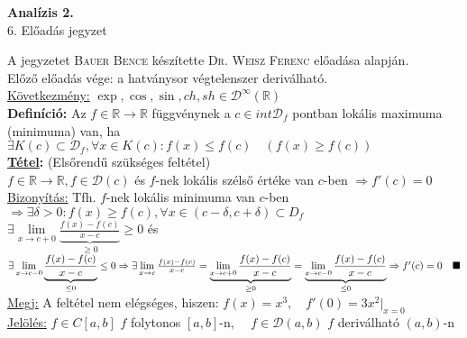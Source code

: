 \documentclass[a4paper,11pt]{article}
\begin{document}
\def\N{\mathbb{N}}
\def\Z{\mathbb{Z}}
\def\R{\mathbb{R}}
\def\biz{\normalsize{\underline{Bizonyítás:} }\hspace*{0.5cm}}
\def\tetel{\normalsize \textbf{\underline{Tétel}: }}
\def\defi{\normalsize \textbf{Definíció: }}
\def\pl{\textbf{Pl:}}
\def\cab{\in C[a,b]}
\def\dab{\in\D(a,b)}
\def\rtr{\R\to\R}
\def\D{\mathcal{D}}
\def\lima{\displaystyle\lim_{a}}
\def\bizva{\quad\blacksquare}
\def\fda{f\in\D(a)}
\begin{center}
	{\LARGE\textbf{Analízis 2.}}\\[0.2cm]
	
	{\Large 6. Előadás jegyzet}\\[0.5cm]	
\end{center}
{\small A jegyzetet \textsc{Bauer Bence} készítette \textsc{Dr. Weisz Ferenc} előadása alapján.}\\[0.4cm]
Előző előadás vége: a hatványsor végtelenszer deriválható.\\[0.1cm]
\underline{Következmény:} $\exp,\cos,\sin,ch,sh\in\D^{\infty}(\R)$\\[0.1cm]
\defi Az $f\in\rtr$ függvénynek a $c\in int\D_f$ pontban lokális maximuma 
(minimuma) van, ha\\[0.1cm]$\exists K(c)\subset\D_f,\forall x\in K(c): f(x)\leq 
f(c)\quad(f(x)\geq f(c))$\\[0.2cm]\tetel (Elsőrendű szükséges feltétel)\\[0.1cm] 
$f\in\rtr,f\in\D(c)$ és $f$-nek lokális szélső értéke van $c$-ben $\Rightarrow 
f'(c)=0$\\[0.1cm]\biz Tfh. $f$-nek lokális minimuma van $c$-ben\\[0.2cm] 
$\Rightarrow\exists\delta>0:f(x)\geq f(c),\forall x\in(c-\delta,c+\delta)\subset 
D_f$\\[0.2cm]$\exists\lim\limits_{x\to c+0}\underbrace{\frac{f(x)-f(c)}{x-c}}
_{\geq0}\geq0$ és $\exists\lim\limits_{x\to c-0}\underbrace{ \frac{f(x)-f(c)}
{x-c}}_{\leq0}\leq0\\[0.2cm]\Rightarrow\exists\lim\limits_{x\to c} 
\frac{f(x)-f(c)}{x-c}=\underbrace{\lim\limits_{x\to c+0}\frac{f(x)-f(c)}{x-c}}_ 
{\geq0}=\underbrace{\lim\limits_{x\to c-0}\frac{f(x)-f(c)}{x-c}}_{\leq0} 
\Rightarrow f'(c)=0\bizva\\[0.4cm]$\hspace*{0.6cm}\underline{Megj:} A feltétel 
nem elégséges, hiszen: $f(x)=x^3,\quad f'(0)=3x^2|_{x=0}$\\[0.2cm]
\underline{Jelölés:} $f\cab$ $f$ folytonos $[a,b]$-n, 
$\quad f\dab$ $f$ deriválható $(a,b)$-n\\[0.3cm]
\end{document}

